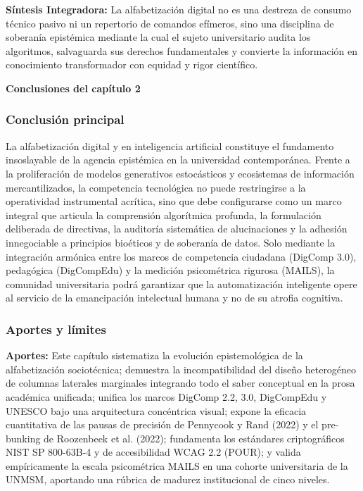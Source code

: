 \vspace{0.6cm}
\begin{cajabeige}
\textbf{Síntesis Integradora:} La alfabetización digital no es una destreza de consumo técnico pasivo ni un repertorio de comandos efímeros, sino una disciplina de soberanía epistémica mediante la cual el sujeto universitario audita los algoritmos, salvaguarda sus derechos fundamentales y convierte la información en conocimiento transformador con equidad y rigor científico.
\end{cajabeige}

\newpage

\newpage
{}
\vspace*{0.8cm}
{\Huge \textbf{Conclusiones del capítulo 2}}
\vspace{0.8cm}

\subsubsection*{Conclusión principal}
La alfabetización digital y en inteligencia artificial constituye el fundamento insoslayable de la agencia epistémica en la universidad contemporánea. Frente a la proliferación de modelos generativos estocásticos y ecosistemas de información mercantilizados, la competencia tecnológica no puede restringirse a la operatividad instrumental acrítica, sino que debe configurarse como un marco integral que articula la comprensión algorítmica profunda, la formulación deliberada de directivas, la auditoría sistemática de alucinaciones y la adhesión innegociable a principios bioéticos y de soberanía de datos. Solo mediante la integración armónica entre los marcos de competencia ciudadana (DigComp 3.0), pedagógica (DigCompEdu) y la medición psicométrica rigurosa (MAILS), la comunidad universitaria podrá garantizar que la automatización inteligente opere al servicio de la emancipación intelectual humana y no de su atrofia cognitiva.

\subsubsection*{Aportes y límites}
\textbf{Aportes:} Este capítulo sistematiza la evolución epistemológica de la alfabetización sociotécnica; demuestra la incompatibilidad del diseño heterogéneo de columnas laterales marginales integrando todo el saber conceptual en la prosa académica unificada; unifica los marcos DigComp 2.2, 3.0, DigCompEdu y UNESCO bajo una arquitectura concéntrica visual; expone la eficacia cuantitativa de las pausas de precisión de Pennycook y Rand (2022) y el pre-bunking de Roozenbeek et al. (2022); fundamenta los estándares criptográficos NIST SP 800-63B-4 y de accesibilidad WCAG 2.2 (POUR); y valida empíricamente la escala psicométrica MAILS en una cohorte universitaria de la UNMSM, aportando una rúbrica de madurez institucional de cinco niveles.

